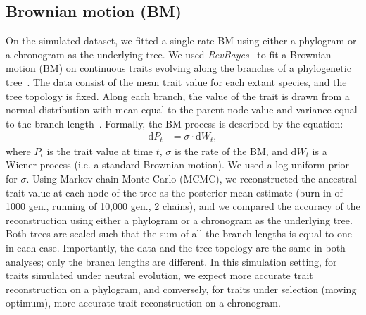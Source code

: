 \documentclass{article}
\newcommand{\Multiply}{\cdot}
\newcommand{\der}{\mathrm{d}}
\newcommand{\Trait}{P}
\begin{document}
\subsection*{Brownian motion (BM)}
On the simulated dataset, we fitted a single rate BM using either a phylogram or a chronogram as the underlying tree.
We used \textit{RevBayes}~\citep{hohna_revbayes_2016} to fit a Brownian motion (BM) on continuous traits evolving along the branches of a phylogenetic tree~\citep{felsenstein_phylogenies_1985, felsenstein_phylogenies_1988a}.
The data consist of the mean trait value for each extant species, and the tree topology is fixed.
Along each branch, the value of the trait is drawn from a normal distribution with mean equal to the parent node value and variance equal to the branch length~\citep{felsenstein_phylogenies_1985}.
Formally, the BM process is described by the equation:
\begin{align}
    \der \Trait_t & = \sigma \Multiply \der W_t,  \label{eq:bm-process}
\end{align}
where $\Trait_t$ is the trait value at time $t$, $\sigma$ is the rate of the BM, and $\der W_t$ is a Wiener process (i.e. a standard Brownian motion).
We used a log-uniform prior for $\sigma$.
Using Markov chain Monte Carlo (MCMC), we reconstructed the ancestral trait value at each node of the tree as the posterior mean estimate (burn-in of 1000 gen., running of 10,000 gen., 2 chains), and we compared the accuracy of the reconstruction using either a phylogram or a chronogram as the underlying tree.
Both trees are scaled such that the sum of all the branch lengths is equal to one in each case.
Importantly, the data and the tree topology are the same in both analyses; only the branch lengths are different.
In this simulation setting, for traits simulated under neutral evolution, we expect more accurate trait reconstruction on a phylogram, and conversely, for traits under selection (moving optimum), more accurate trait reconstruction on a chronogram.
\end{document}
